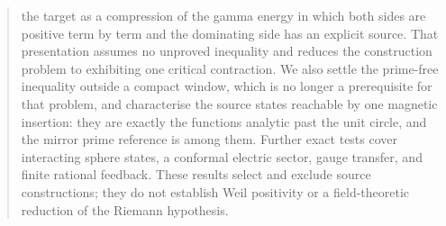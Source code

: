 \documentclass[11pt]{article}
\numberwithin{equation}{section}
\theoremstyle{definition}
\theoremstyle{remark}
\begin{document}
\begin{abstract}
the target as a compression of the gamma energy in which both sides are
positive term by term and the dominating side has an explicit source. That
presentation assumes no unproved inequality and reduces the construction
problem to exhibiting one critical contraction. We also settle the prime-free
inequality outside a compact window, which is no longer a prerequisite for that
problem, and characterise the source states reachable by one magnetic
insertion: they are exactly the functions analytic past the unit circle, and
the mirror prime reference is among them. Further exact tests
cover interacting sphere states, a conformal electric sector, gauge transfer,
and finite rational feedback. These results select and exclude source
constructions; they do not establish Weil positivity or a field-theoretic
reduction of the Riemann hypothesis.
\end{abstract}

\clearpage
{\small\tableofcontents}
\clearpage







\appendix




\clearpage
{}
{}

\end{document}
